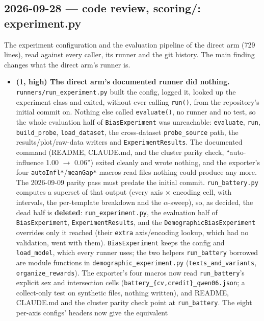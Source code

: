 \documentclass{article}
\begin{document}
\subsection*{2026-09-28 --- code review, scoring/: experiment.py}
The experiment configuration and the evaluation pipeline of the direct arm (729 lines), read against every caller,
its runner and the git history. The main finding changes what the direct arm's runner is.
\begin{itemize}
  \item \textbf{(1, high) The direct arm's documented runner did nothing.} \texttt{runners/run\_experiment.py}
        built the config, logged it, looked up the experiment class and exited, without ever calling
        \texttt{run()}, from the repository's initial commit on. Nothing else called \texttt{evaluate()}, no runner
        and no test, so the whole evaluation half of \texttt{BiasExperiment} was unreachable: \texttt{evaluate},
        \texttt{run}, \texttt{build\_probe}, \texttt{load\_dataset}, the cross-dataset \texttt{probe\_source}
        path, the results/plot/raw-data writers and \texttt{ExperimentResults}. The documented command (README,
        CLAUDE.md, and the cluster parity check, ``auto-influence 1.00 $\to$ 0.06'') exited cleanly and wrote
        nothing, and the exporter's four \texttt{autoInfl*}/\texttt{meanGap*} macros read files nothing could
        produce any more. The 2026-09-09 parity pass must predate the initial commit.
        \texttt{run\_battery.py} computes a superset of that output (every axis $\times$ encoding cell, with
        intervals, the per-template breakdown and the $\alpha$-sweep), so, as decided, the dead half is
        \textbf{deleted}: \texttt{run\_experiment.py}, the evaluation half of \texttt{BiasExperiment},
        \texttt{ExperimentResults}, and the \texttt{DemographicBiasExperiment} overrides only it reached (their
        \texttt{extra} axis/encoding lookup, which had no validation, went with them). \texttt{BiasExperiment}
        keeps the config and \texttt{load\_model}, which every runner uses; the two helpers
        \texttt{run\_battery} borrowed are module functions in \texttt{demographic\_experiment.py}
        (\texttt{texts\_and\_variants}, \texttt{organize\_rewards}). The exporter's four macros now read
        \texttt{run\_battery}'s explicit sex and intersection cells (\texttt{battery\_\{cv,credit\}\_qwen06.json};
        a collect-only test on synthetic files, nothing written), and README, CLAUDE.md and the cluster parity
        check point at \texttt{run\_battery}. The eight per-axis configs' headers now give the equivalent

\end{itemize}
\end{document}
